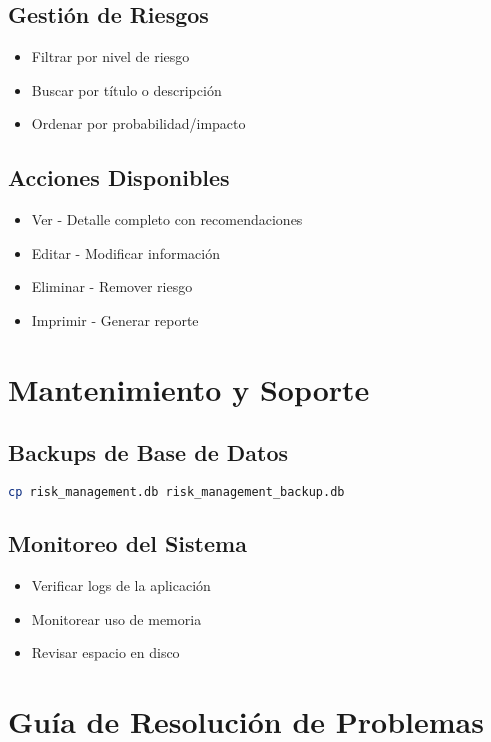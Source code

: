 \documentclass[12pt, a4paper, oneside]{article}
\begin{document}
\subsection{Gestión de Riesgos}
\begin{itemize}
    \item Filtrar por nivel de riesgo
    \item Buscar por título o descripción
    \item Ordenar por probabilidad/impacto
\end{itemize}

\subsection{Acciones Disponibles}
\begin{itemize}
    \item Ver - Detalle completo con recomendaciones
    \item Editar - Modificar información
    \item Eliminar - Remover riesgo
    \item Imprimir - Generar reporte
\end{itemize}

\section{Mantenimiento y Soporte}

\subsection{Backups de Base de Datos}
\begin{lstlisting}[language=bash]
cp risk_management.db risk_management_backup.db
\end{lstlisting}

\subsection{Monitoreo del Sistema}
\begin{itemize}
    \item Verificar logs de la aplicación
    \item Monitorear uso de memoria
    \item Revisar espacio en disco
\end{itemize}

\section{Guía de Resolución de Problemas}
\end{document}
